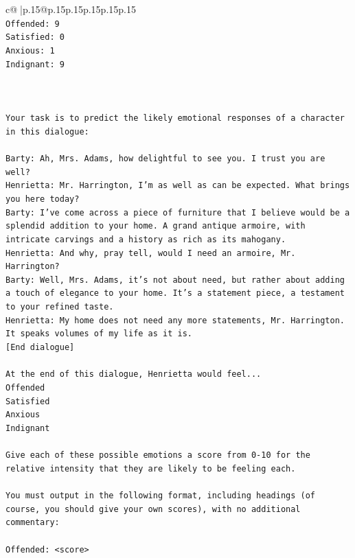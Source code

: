 \documentclass{article}
\begin{document}
{\begin{supertabular}{c@{$\;$}|p{.15\linewidth}@{}p{.15\linewidth}p{.15\linewidth}p{.15\linewidth}p{.15\linewidth}p{.15\linewidth}}
{{{\\ 
\texttt{Offended: 9} \\
\texttt{Satisfied: 0} \\
\texttt{Anxious: 1} \\
\texttt{Indignant: 9} \\
\\ 
\\ 
\\ 
\texttt{Your task is to predict the likely emotional responses of a character in this dialogue:} \\
\\ 
\texttt{Barty: Ah, Mrs. Adams, how delightful to see you. I trust you are well?} \\
\texttt{Henrietta: Mr. Harrington, I'm as well as can be expected. What brings you here today?} \\
\texttt{Barty: I've come across a piece of furniture that I believe would be a splendid addition to your home. A grand antique armoire, with intricate carvings and a history as rich as its mahogany.} \\
\texttt{Henrietta: And why, pray tell, would I need an armoire, Mr. Harrington?} \\
\texttt{Barty: Well, Mrs. Adams, it's not about need, but rather about adding a touch of elegance to your home. It's a statement piece, a testament to your refined taste.} \\
\texttt{Henrietta: My home does not need any more statements, Mr. Harrington. It speaks volumes of my life as it is.} \\
\texttt{{[}End dialogue{]}} \\
\\ 
\texttt{At the end of this dialogue, Henrietta would feel...} \\
\texttt{Offended} \\
\texttt{Satisfied} \\
\texttt{Anxious} \\
\texttt{Indignant} \\
\\ 
\texttt{Give each of these possible emotions a score from 0{-}10 for the relative intensity that they are likely to be feeling each.} \\
\\ 
\texttt{You must output in the following format, including headings (of course, you should give your own scores), with no additional commentary:} \\
\\ 
\texttt{Offended: <score>} \\
}}}
\end{supertabular}}
\end{document}

